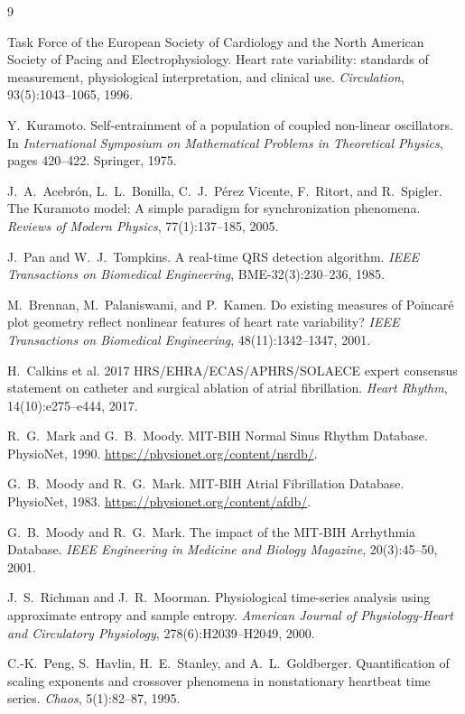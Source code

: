 \documentclass[11pt]{article}
\begin{document}
\begin{thebibliography}{9}

Task Force of the European Society of Cardiology and the North American
Society of Pacing and Electrophysiology. Heart rate variability:
standards of measurement, physiological interpretation, and clinical
use. \emph{Circulation}, 93(5):1043--1065, 1996.

Y.~Kuramoto. Self-entrainment of a population of coupled non-linear
oscillators. In \emph{International Symposium on Mathematical Problems
in Theoretical Physics}, pages 420--422. Springer, 1975.

J.~A.~Acebr\'on, L.~L.~Bonilla, C.~J.~P\'erez Vicente, F.~Ritort, and
R.~Spigler. The Kuramoto model: A simple paradigm for synchronization
phenomena. \emph{Reviews of Modern Physics}, 77(1):137--185, 2005.

J.~Pan and W.~J.~Tompkins. A real-time QRS detection algorithm.
\emph{IEEE Transactions on Biomedical Engineering},
BME-32(3):230--236, 1985.

M.~Brennan, M.~Palaniswami, and P.~Kamen. Do existing measures of
Poincar\'e plot geometry reflect nonlinear features of heart rate
variability? \emph{IEEE Transactions on Biomedical Engineering},
48(11):1342--1347, 2001.

H.~Calkins et al. 2017 HRS/EHRA/ECAS/APHRS/SOLAECE expert consensus
statement on catheter and surgical ablation of atrial fibrillation.
\emph{Heart Rhythm}, 14(10):e275--e444, 2017.

R.~G.~Mark and G.~B.~Moody. MIT-BIH Normal Sinus Rhythm Database.
PhysioNet, 1990. \url{https://physionet.org/content/nsrdb/}.

G.~B.~Moody and R.~G.~Mark. MIT-BIH Atrial Fibrillation Database.
PhysioNet, 1983. \url{https://physionet.org/content/afdb/}.

G.~B.~Moody and R.~G.~Mark. The impact of the MIT-BIH Arrhythmia
Database. \emph{IEEE Engineering in Medicine and Biology Magazine},
20(3):45--50, 2001.

J.~S.~Richman and J.~R.~Moorman. Physiological time-series analysis
using approximate entropy and sample entropy. \emph{American Journal of
Physiology-Heart and Circulatory Physiology}, 278(6):H2039--H2049,
2000.

C.-K.~Peng, S.~Havlin, H.~E.~Stanley, and A.~L.~Goldberger.
Quantification of scaling exponents and crossover phenomena in
nonstationary heartbeat time series. \emph{Chaos}, 5(1):82--87, 1995.


\end{thebibliography}
\end{document}
